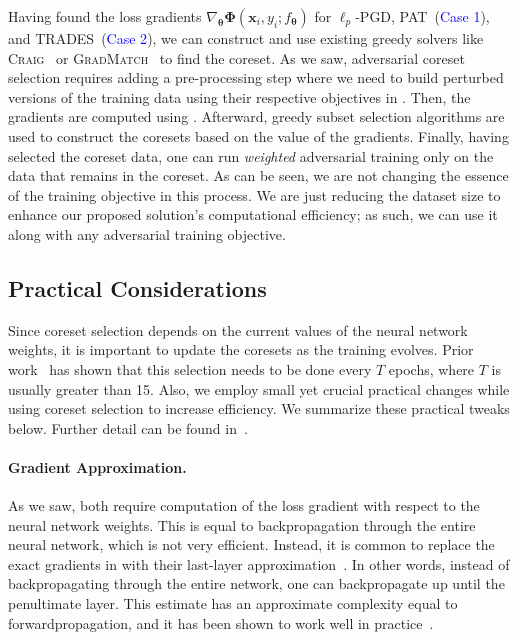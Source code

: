 \documentclass[runningheads]{llncs}
\begin{document}
Having found the loss gradients $\nabla_{\boldsymbol{\theta}}\boldsymbol{\Phi} \left(\boldsymbol{x}_{i}, y_{i}; f_{\boldsymbol{\theta}}\right)$ for $\ell_p$-PGD, PAT~(\textcolor{blue}{Case 1}), and TRADES~(\textcolor{blue}{Case 2}), we can construct  and use existing greedy solvers like \textsc{Craig}~\cite{mirzasoleiman2020craig} or \textsc{GradMatch}~\cite{killamsetty2021gradmatch} to find the coreset.
As we saw, adversarial coreset selection requires adding a pre-processing step where we need to build perturbed versions of the training data using their respective objectives in .
Then, the gradients are computed using .
Afterward, greedy subset selection algorithms are used to construct the coresets based on the value of the gradients.
Finally, having selected the coreset data, one can run \textit{weighted} adversarial training only on the data that remains in the coreset.
As can be seen, we are not changing the essence of the training objective in this process.
We are just reducing the dataset size to enhance our proposed solution's computational efficiency; as such, we can use it along with any adversarial training objective.

\subsection{Practical Considerations}\label{sub:sub:practical}

Since coreset selection depends on the current values of the neural network weights, it is important to update the coresets as the training evolves.
Prior work~\cite{killamsetty2021glister,killamsetty2021gradmatch} has shown that this selection needs to be done every $T$ epochs, where $T$ is usually greater than 15.
Also, we employ small yet crucial practical changes while using coreset selection to increase efficiency.
We summarize these practical tweaks below.
Further detail can be found in~\cite{killamsetty2021gradmatch,mirzasoleiman2020craig}.
\paragraph{Gradient Approximation.}
	As we saw, both  require computation of the loss gradient with respect to the neural network weights.
	This is equal to backpropagation through the entire neural network, which is not very efficient.
	Instead, it is common to replace the exact gradients in  with their last-layer approximation~\cite{katharopoulos2018notall,mirzasoleiman2020craig,killamsetty2021gradmatch}.
	In other words, instead of backpropagating through the entire network, one can backpropagate up until the penultimate layer.
	This estimate has an approximate complexity equal to forwardpropagation, and it has been shown to work well in practice~\cite{mirzasoleiman2020craig,mirzasoleiman2020crust,killamsetty2021glister,killamsetty2021gradmatch}.
\end{document}
